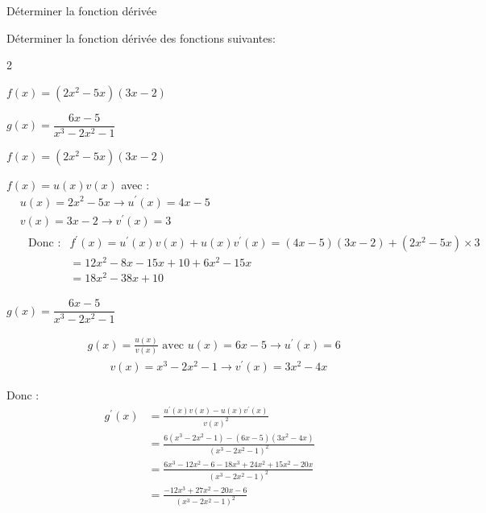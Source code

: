     \begin{bmethodet}{Déterminer la fonction dérivée}
    	
    	Déterminer la fonction dérivée des fonctions suivantes:
    	\begin{multicols}{2}
    		\begin{enumMet}
    			\item $f(x)=\left(2 x^2-5 x\right)(3 x-2)$
    			\item $g(x)=\dfrac{6 x-5}{x^3-2 x^2-1}$
    		\end{enumMet}
    	\end{multicols}
    	
    	\begin{enumMet}
    		\item $f(x)=\left(2 x^2-5 x\right)(3 x-2)$
    		
    		$f(x)=u(x) v(x)$ avec :
    		$$
    		\begin{aligned}
    			& u(x)=2 x^2-5 x \rightarrow u^{\prime}(x)=4 x-5 \\
    			& v(x)=3 x-2 \rightarrow v^{\prime}(x)=3 \\
    			& \begin{aligned}
    				\text { Donc }: & f^{\prime}(x)=u^{\prime}(x) v(x)+u(x) v^{\prime}(x)=(4 x-5)(3 x-2)+\left(2 x^2-5 x\right) \times 3 \\
    				& =12 x^2-8 x-15 x+10+6 x^2-15 x \\
    				& =18 x^2-38 x+10
    			\end{aligned}
    		\end{aligned}
    		$$
    		\item $g(x)=\dfrac{6 x-5}{x^3-2 x^2-1}$
    		
    		$$
    		\begin{aligned}
    			& g(x)=\frac{u(x)}{v(x)} \text { avec } u(x)=6 x-5 \rightarrow u^{\prime}(x)=6 \\
    			& \qquad v(x)=x^3-2 x^2-1 \rightarrow v^{\prime}(x)=3 x^2-4 x
    		\end{aligned}
    		$$
    		
    		
    		
    		Donc :
    		$$
    		\begin{aligned}
    			g^{\prime}(x) & =\frac{u^{\prime}(x) v(x)-u(x) v^{\prime}(x)}{v(x)^2} \\
    			& =\frac{6\left(x^3-2 x^2-1\right)-(6 x-5)\left(3 x^2-4 x\right)}{\left(x^3-2 x^2-1\right)^2} \\
    			& =\frac{6 x^3-12 x^2-6-18 x^3+24 x^2+15 x^2-20 x}{\left(x^3-2 x^2-1\right)^2}\\
    			& =\frac{-12 x^3+27 x^2-20 x-6}{\left(x^3-2 x^2-1\right)^2}
    		\end{aligned}
    		$$
    	\end{enumMet}
    \end{bmethodet}
    
